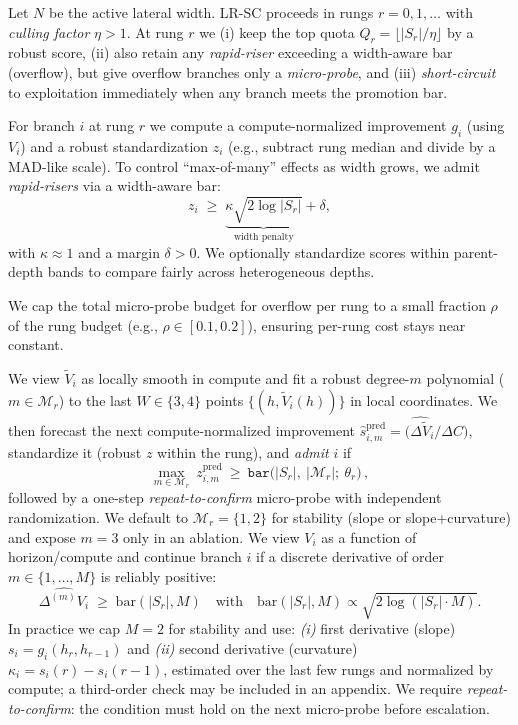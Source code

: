\documentclass{article}
\begin{document}
Let $N$ be the active lateral width.
LR-SC proceeds in rungs $r=0,1,\dots$ with \emph{culling factor} $\eta>1$.
At rung $r$ we (i) keep the top quota $Q_r=\lfloor |S_r|/\eta \rfloor$ by a robust score, (ii) also retain any \emph{rapid-riser} exceeding a width-aware bar (overflow), but give overflow branches only a \emph{micro-probe}, and (iii) \emph{short-circuit} to exploitation immediately when any branch meets the promotion bar.

For branch $i$ at rung $r$ we compute a compute-normalized improvement $g_i$ (using $V_i$) and a robust standardization $z_i$ (e.g., subtract rung median and divide by a MAD-like scale).
To control ``max-of-many'' effects as width grows, we admit \emph{rapid-risers} via a width-aware bar:
\[
z_i \;\ge\; \underbrace{\kappa \sqrt{2\log |S_r|}}_{\text{width penalty}} + \delta,
\]
with $\kappa\approx 1$ and a margin $\delta>0$.
We optionally standardize scores within parent-depth bands to compare fairly across heterogeneous depths.

We cap the total micro-probe budget for overflow per rung to a small fraction $\rho$ of the rung budget (e.g., $\rho\in[0.1,0.2]$), ensuring per-rung cost stays near constant.

We view $\tilde V_i$ as locally smooth in compute and fit a robust degree-$m$ polynomial ($m\!\in\!\mathcal{M}_r$)
to the last $W\in\{3,4\}$ points $\{(h,\tilde V_i(h))\}$ in local coordinates.
We then forecast the next compute-normalized improvement
$\widehat{s}^{\mathrm{pred}}_{i,m}=\big(\widehat{\Delta \tilde V}_i / \Delta C\big)$,
standardize it (robust $z$ within the rung), and \emph{admit} $i$ if
\begin{equation}
\max_{m\in\mathcal{M}_r}\ z^{\mathrm{pred}}_{i,m}\ \ge\ \texttt{bar}\!\big(|S_r|,\ |\mathcal{M}_r|;\ \theta_r\big)\,,
\end{equation}
followed by a one-step \emph{repeat-to-confirm} micro-probe with independent randomization.
We default to $\mathcal{M}_r{=}\{1,2\}$ for stability (slope or slope+curvature) and expose $m{=}3$ only in an ablation.
We view $V_i$ as a function of horizon/compute and continue branch $i$ if a discrete derivative of order $m\in\{1,\dots,M\}$ is reliably positive:
\[
\widehat{\Delta^{(m)} V_i} \;\ge\; \text{bar}(|S_r|,M) \quad\text{with}\quad \text{bar}(|S_r|,M)\propto \sqrt{2\log(|S_r|\cdot M)}.
\]
In practice we cap $M=2$ for stability and use:
\emph{(i)} first derivative (slope) $s_i = g_i(h_r,h_{r-1})$ and
\emph{(ii)} second derivative (curvature) $\kappa_i = s_i(r)-s_i(r-1)$,
estimated over the last few rungs and normalized by compute; a third-order check may be included in an appendix.
We require \emph{repeat-to-confirm}: the condition must hold on the next micro-probe before escalation.
\end{document}
